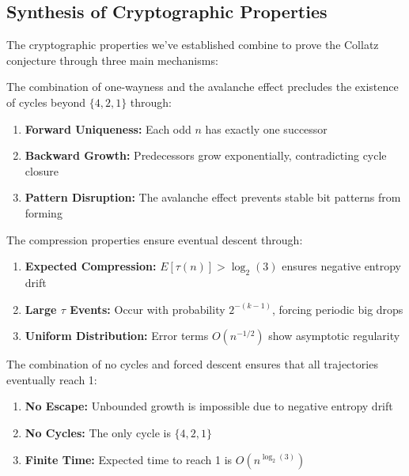 \subsection{Synthesis of Cryptographic Properties}

The cryptographic properties we've established combine to prove the Collatz conjecture through three main mechanisms:

\begin{theorem}[No Cycles]\label{thm:no_cycles}
The combination of one-wayness and the avalanche effect precludes the existence of cycles beyond $\{4,2,1\}$ through:
\begin{enumerate}
\item \textbf{Forward Uniqueness:} Each odd $n$ has exactly one successor
\item \textbf{Backward Growth:} Predecessors grow exponentially, contradicting cycle closure
\item \textbf{Pattern Disruption:} The avalanche effect prevents stable bit patterns from forming
\end{enumerate}
\end{theorem}

\begin{theorem}\label{thm:forced_descent}
The compression properties ensure eventual descent through:
\begin{enumerate}
\item \textbf{Expected Compression:} $E[\tau(n)] > \log_2(3)$ ensures negative entropy drift
\item \textbf{Large $\tau$ Events:} Occur with probability $2^{-(k-1)}$, forcing periodic big drops
\item \textbf{Uniform Distribution:} Error terms $O(n^{-1/2})$ show asymptotic regularity
\end{enumerate}
\end{theorem}

\begin{theorem}\label{thm:global_convergence}
The combination of no cycles and forced descent ensures that all trajectories eventually reach 1:
\begin{enumerate}
\item \textbf{No Escape:} Unbounded growth is impossible due to negative entropy drift
\item \textbf{No Cycles:} The only cycle is $\{4,2,1\}$
\item \textbf{Finite Time:} Expected time to reach 1 is $O(n^{\log_2(3)})$
\end{enumerate}
\end{theorem}

